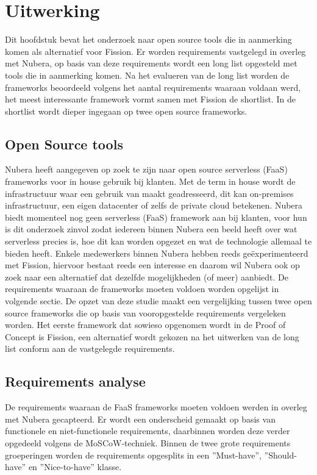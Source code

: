 \chapter{Uitwerking}
\label{ch:uitwerking}

Dit hoofdstuk bevat het onderzoek naar open source tools die in aanmerking komen als alternatief voor Fission. Er worden requirements vastgelegd in overleg met Nubera, op basis van deze requirements wordt een long list opgesteld met tools die in aanmerking komen. Na het evalueren van de long list worden de frameworks beoordeeld volgens het aantal requirements waaraan voldaan werd, het meest interessante framework vormt samen met Fission de shortlist. In de shortlist wordt dieper ingegaan op twee open source frameworks.

\section{Open Source tools}
Nubera heeft aangegeven op zoek te zijn naar open source serverless (FaaS) frameworks voor in house gebruik bij klanten. Met de term in house wordt de  infrastructuur waar een gebruik van maakt geadresseerd, dit kan on-premises infrastructuur, een eigen datacenter of zelfs de private cloud betekenen. Nubera biedt momenteel nog geen serverless (FaaS) framework aan bij klanten, voor hun is dit onderzoek zinvol zodat iedereen binnen Nubera een beeld heeft over wat serverless precies is, hoe dit kan worden opgezet en wat de technologie allemaal te bieden heeft. Enkele medewerkers binnen Nubera hebben reeds geëxperimenteerd met Fission, hiervoor bestaat reeds een interesse en daarom wil Nubera ook op zoek naar een alternatief dat dezelfde mogelijkheden (of meer) aanbiedt. De requirements waaraan de frameworks moeten voldoen worden opgelijst in volgende sectie. De opzet van deze studie maakt een vergelijking tussen twee open source frameworks die op basis van vooropgestelde requirements vergeleken worden. Het eerste framework dat sowieso opgenomen wordt in de Proof of Concept is Fission, een alternatief wordt gekozen na het uitwerken van de long list conform aan de vastgelegde requirements.

\section{Requirements analyse}
De requirements waaraan de FaaS frameworks moeten voldoen werden in overleg met Nubera gecapteerd. Er wordt een onderscheid gemaakt op basis van functionele en niet-functionele requirements, daarbinnen worden deze verder opgedeeld volgens de MoSCoW-techniek. Binnen de twee grote requirements groeperingen worden de requirements opgesplits in een ''Must-have'', ''Should-have'' en ''Nice-to-have'' klasse.

